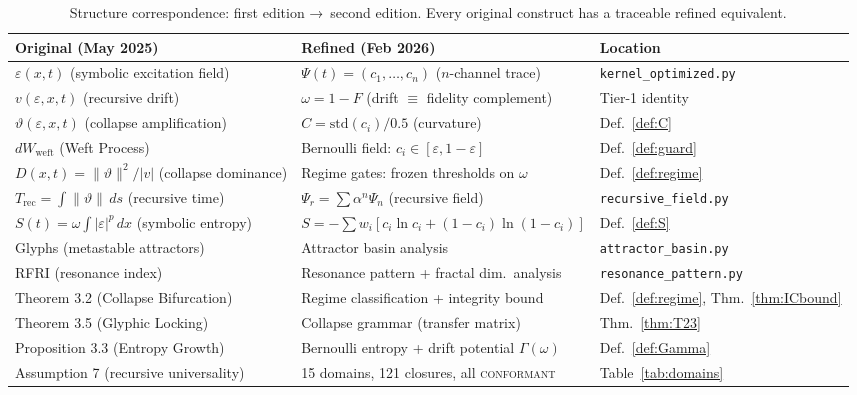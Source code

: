 \documentclass[
  aps,
  prd,
  preprint,
  superscriptaddress,
  nofootinbib,
  floatfix,
  longbibliography
]{revtex4-2}
\newcommand{\Gam}{\Gamma}
\newcommand{\eps}{\varepsilon}
\newcommand{\regime}[1]{\textnormal{\textsc{#1}}}
\newcommand{\conform}{\regime{conformant}}
\newcommand{\Fid}{F}
\newcommand{\Drft}{\omega}
\newcommand{\Ent}{S}
\newcommand{\Curv}{C}
\newcommand{\Psifield}{\Psi}
\newcommand{\Psirec}{\Psi_{r}}
\begin{document}
\begin{table}[t]
\centering
\small
\caption{Structure correspondence: first edition →\ second edition.
  Every original construct has a traceable refined equivalent.}
\label{tab:correspondence}
\begin{tabular}{@{}p{5.6cm}p{5.6cm}l@{}}
\toprule
\textbf{Original (May 2025)} &
\textbf{Refined (Feb 2026)} &
\textbf{Location} \\
\midrule
$\varepsilon(x,t)$ (symbolic excitation field) &
$\Psifield(t) = (c_1, \ldots, c_n)$ ($n$-channel trace) &
\texttt{kernel\_optimized.py} \\
$v(\varepsilon,x,t)$ (recursive drift) &
$\Drft = 1 - \Fid$ (drift $\equiv$ fidelity complement) &
Tier-1 identity \\
$\vartheta(\varepsilon,x,t)$ (collapse amplification) &
$\Curv = \mathrm{std}(c_i)/0.5$ (curvature) &
Def.~\ref{def:C} \\
$dW_{\mathrm{weft}}$ (Weft Process) &
Bernoulli field: $c_i \in [\eps, 1-\eps]$ &
Def.~\ref{def:guard} \\
$D(x,t) = \|\vartheta\|^2/|v|$ (collapse dominance) &
Regime gates: frozen thresholds on $\Drft$ &
Def.~\ref{def:regime} \\
$T_{\mathrm{rec}} = \int \|\vartheta\|\,ds$ (recursive time) &
$\Psirec = \sum \alpha^n \Psifield_n$ (recursive field) &
\texttt{recursive\_field.py} \\
$S(t) = \omega\int|\varepsilon|^p\,dx$ (symbolic entropy) &
$\Ent = -\sum w_i[c_i\ln c_i + (1-c_i)\ln(1-c_i)]$ &
Def.~\ref{def:S} \\
Glyphs (metastable attractors) &
Attractor basin analysis &
\texttt{attractor\_basin.py} \\
RFRI (resonance index) &
Resonance pattern + fractal dim.\ analysis &
\texttt{resonance\_pattern.py} \\
Theorem 3.2 (Collapse Bifurcation) &
Regime classification + integrity bound &
Def.~\ref{def:regime}, Thm.~\ref{thm:ICbound} \\
Theorem 3.5 (Glyphic Locking) &
Collapse grammar (transfer matrix) &
Thm.~\ref{thm:T23} \\
Proposition 3.3 (Entropy Growth) &
Bernoulli entropy + drift potential $\Gam(\Drft)$ &
Def.~\ref{def:Gamma} \\
Assumption 7 (recursive universality) &
15 domains, 121 closures, all \conform{} &
Table~\ref{tab:domains} \\
\bottomrule
\end{tabular}
\end{table}
\end{document}
